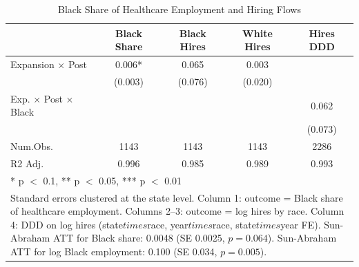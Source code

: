 \begin{table}
\centering
\caption{Black Share of Healthcare Employment and Hiring Flows}
\centering
\label{tab:shares}
\begin{tabular}[t]{lcccc}
\toprule
  & Black Share & Black Hires & White Hires & Hires DDD\\
\midrule
Expansion $\times$ Post & 0.006* & 0.065 & 0.003 & \\
 & (0.003) & (0.076) & (0.020) & \\
Exp. $\times$ Post $\times$ Black &  &  &  & 0.062\\
 &  &  &  & (0.073)\\
\midrule
Num.Obs. & 1143 & 1143 & 1143 & 2286\\
R2 Adj. & 0.996 & 0.985 & 0.989 & 0.993\\
\bottomrule
\multicolumn{5}{l}{\rule{0pt}{1em}* p $<$ 0.1, ** p $<$ 0.05, *** p $<$ 0.01}\\
\multicolumn{5}{l}{\parbox{0.85\textwidth}{\small Standard errors clustered at the state level. Column 1: outcome = Black share of healthcare employment. Columns 2--3: outcome = log hires by race. Column 4: DDD on log hires (state$times$race, year$times$race, state$times$year FE). Sun-Abraham ATT for Black share: 0.0048 (SE 0.0025, $p = 0.064$). Sun-Abraham ATT for log Black employment: 0.100 (SE 0.034, $p = 0.005$).}}\\
\end{tabular}
\end{table}
